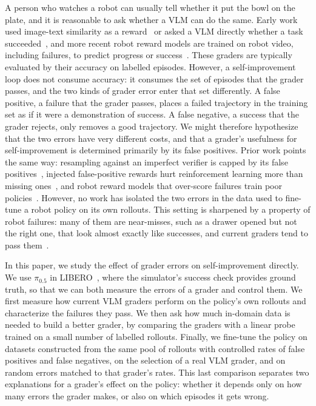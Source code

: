 \documentclass[letterpaper, journal, twoside]{IEEEtran}
\newcommand{\pizerofive}{$\pi_{0.5}$}
\begin{document}
A person who watches a robot can usually tell whether it put the bowl on the plate, and it is reasonable to ask whether
a VLM can do the same. Early work used image-text similarity as a reward~\cite{vlmrm,roboclip} or asked a VLM
directly whether a task succeeded~\cite{successvqa}, and more recent robot reward models are trained on robot video,
including failures, to predict progress or success~\cite{gvl,roboreward,robometer}. These graders are typically
evaluated by their accuracy on labelled episodes. However, a self-improvement loop does not consume accuracy: it consumes
the set of episodes that the grader passes, and the two kinds of grader error enter that set differently. A false
positive, a failure that the grader passes, places a failed trajectory in the training set as if it were a
demonstration of success. A false negative, a success that the grader rejects, only removes a good trajectory. We might
therefore hypothesize that the two errors have very different costs, and that a grader's usefulness for
self-improvement is determined primarily by its false positives. Prior work points the same way: resampling against an
imperfect verifier is capped by its false positives~\cite{flaws}, injected false-positive rewards hurt reinforcement
learning more than missing ones~\cite{huang2025darkside}, and robot reward models that over-score failures train poor
policies~\cite{roboref,tian2026bad}. However, no work has isolated the two errors in the data used to fine-tune a robot
policy on its own rollouts. This setting is sharpened by a property of robot failures: many of them are near-misses,
such as a drawer opened but not the right one, that look almost exactly like successes, and current graders tend to
pass them~\cite{failbench,tian2026bad}.

In this paper, we study the effect of grader errors on self-improvement directly. We use \pizerofive{} in
LIBERO~\cite{libero}, where the simulator's success check provides ground truth, so that we can both measure the
errors of a grader and control them. We first measure how current VLM graders perform on the policy's own rollouts and
characterize the failures they pass. We then ask how much in-domain data is needed to build a better grader, by
comparing the graders with a linear probe trained on a small number of labelled rollouts. Finally, we fine-tune the
policy on datasets constructed from the same pool of rollouts with controlled rates of false positives and false
negatives, on the selection of a real VLM grader, and on random errors matched to that grader's rates. This last
comparison separates two explanations for a grader's effect on the policy: whether it depends only on how many errors
the grader makes, or also on which episodes it gets wrong.
\end{document}
